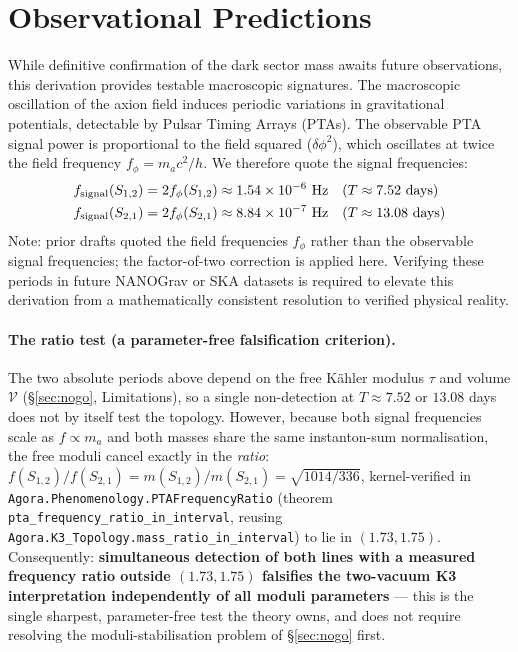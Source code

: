 \documentclass[11pt,a4paper]{article}
\begin{document}
\section{Observational Predictions}
While definitive confirmation of the dark sector mass awaits future observations, this derivation provides testable macroscopic signatures. The macroscopic oscillation of the axion field induces periodic variations in gravitational potentials, detectable by Pulsar Timing Arrays (PTAs). The observable PTA signal power is proportional to the field squared ($\delta\phi^2$), which oscillates at twice the field frequency $f_\phi = m_a c^2 / h$. We therefore quote the signal frequencies:
\begin{align}
f_{\rm signal}(S_{1,2}) &= 2 f_\phi(S_{1,2}) \approx 1.54 \times 10^{-6} \text{ Hz} \quad (T \approx 7.52 \text{ days}) \\
f_{\rm signal}(S_{2,1}) &= 2 f_\phi(S_{2,1}) \approx 8.84 \times 10^{-7} \text{ Hz} \quad (T \approx 13.08 \text{ days})
\end{align}
Note: prior drafts quoted the field frequencies $f_\phi$ rather than the observable signal frequencies; the factor-of-two correction is applied here. Verifying these periods in future NANOGrav or SKA datasets is required to elevate this derivation from a mathematically consistent resolution to verified physical reality.

\paragraph{The ratio test (a parameter-free falsification criterion).} The two absolute periods above depend on the free Kähler modulus $\tau$ and volume $\mathcal{V}$ (\S\ref{sec:nogo}, Limitations), so a single non-detection at $T\approx7.52$ or $13.08$ days does not by itself test the topology. However, because both signal frequencies scale as $f\propto m_a$ and both masses share the same instanton-sum normalisation, the free moduli cancel exactly in the \emph{ratio}: $f(S_{1,2})/f(S_{2,1}) = m(S_{1,2})/m(S_{2,1}) = \sqrt{1014/336}$, kernel-verified in \texttt{Agora.Phenomenology.PTAFrequencyRatio} (theorem \texttt{pta\_frequency\_ratio\_in\_interval}, reusing \texttt{Agora.K3\_Topology.mass\_ratio\_in\_interval}) to lie in $(1.73,1.75)$. Consequently: \textbf{simultaneous detection of both lines with a measured frequency ratio outside $(1.73,1.75)$ falsifies the two-vacuum K3 interpretation independently of all moduli parameters} — this is the single sharpest, parameter-free test the theory owns, and does not require resolving the moduli-stabilisation problem of \S\ref{sec:nogo} first.
\end{document}
